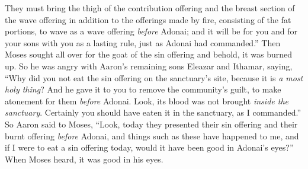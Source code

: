 \begin{biblechapter}
\verse They must bring the thigh of the contribution offering and the breast section of the wave offering in addition to the offerings made by fire, consisting of the fat portions, to wave as a wave offering \textit{before} Adonai; and it will be for you and for your sons with you as a lasting rule, just as Adonai had commanded.”
 Then Moses sought all over for the goat of the sin offering and behold, it was burned up. So he was angry with Aaron’s remaining sons Eleazar and Ithamar, saying,
\verse “Why did you not eat the sin offering on the sanctuary’s site, because it is \textit{a most holy thing}? And he gave it to you to remove the community’s guilt, to make atonement for them \textit{before} Adonai.
\verse Look, its blood was not brought \textit{inside the sanctuary}. Certainly you should have eaten it in the sanctuary, as I commanded.”
\verse So Aaron said to Moses, “Look, today they presented their sin offering and their burnt offering \textit{before} Adonai, and things such as these have happened to me, and if I were to eat a sin offering today, would it have been good in Adonai’s eyes?”
\verse When Moses heard, it was good in his eyes.
\end{biblechapter}

